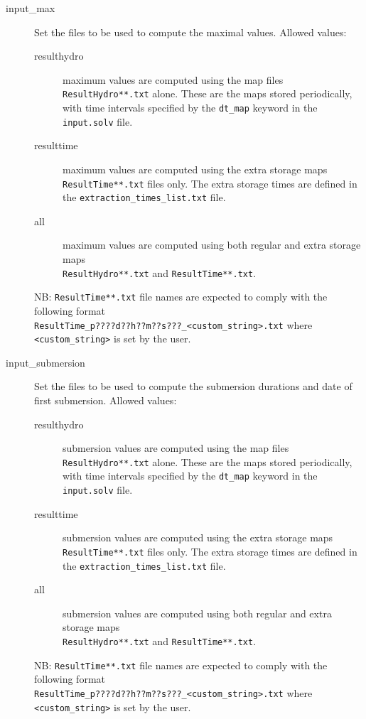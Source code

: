 \begin{description}
\item[input\_max]  Set the files to be used to compute the maximal values. Allowed values:
\begin{description}
\item[resulthydro] maximum values are computed using the map files \texttt{ResultHydro**.txt} alone. These are the maps stored periodically, with time intervals specified by the \texttt{dt\_map} keyword in the \texttt{input.solv} file.
\item[resulttime] maximum values are computed using the extra storage maps \texttt{ResultTime**.txt} files only. The extra storage times are defined in the \texttt{extraction\_times\_list.txt} file. 
\item[all] maximum values are computed using both regular and extra storage maps \\\texttt{ResultHydro**.txt} and \texttt{ResultTime**.txt}.
\end{description}
NB: \texttt{ResultTime**.txt} file names are expected to comply with the following format \\\texttt{ResultTime\_p????d??h??m??s???\_<custom\_string>.txt} where \texttt{<custom\_string>} is set by the user.

\item[input\_submersion]  Set the files to be used to compute the submersion durations and date of first submersion. Allowed values:
\begin{description}
\item[resulthydro] submersion values are computed using the map files \texttt{ResultHydro**.txt} alone. These are the maps stored periodically, with time intervals specified by the \texttt{dt\_map} keyword in the \texttt{input.solv} file.
\item[resulttime] submersion values are computed using the extra storage maps \texttt{ResultTime**.txt} files only. The extra storage times are defined in the \texttt{extraction\_times\_list.txt} file. 
\item[all] submersion values are computed using both regular and extra storage maps \\\texttt{ResultHydro**.txt} and \texttt{ResultTime**.txt}.
\end{description}
NB: \texttt{ResultTime**.txt} file names are expected to comply with the following format \\\texttt{ResultTime\_p????d??h??m??s???\_<custom\_string>.txt} where \texttt{<custom\_string>} is set by the user.


\end{description}
